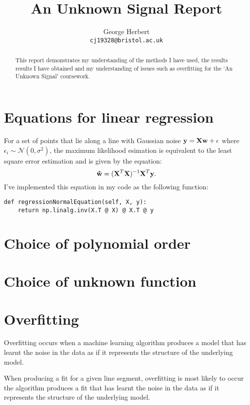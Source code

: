 \documentclass[onecolumn, 12pt, a4paper]{article}
\author{
  George Herbert\\
  \texttt{cj19328@bristol.ac.uk}
}
\title{An Unknown Signal Report}
\begin{document}
\maketitle

\begin{abstract}
    This report demonstrates my understanding of the methods I have 
    used, the results results I have obtained and my understanding
    of issues such as overfitting for the `An Unknown Signal'
    coursework.
\end{abstract}

\section{Equations for linear regression}

For a set of points that lie along a line with Gaussian noise 
$\vb{y} = \vb{X}\vb{w} + \vb{\epsilon}$ where $\epsilon_{i} \sim \mathcal{N}(0, \sigma^{2})$,
the maximum likelihood esimation is equivalent to the least square 
error estimation and is given by the equation:
\[
    \vb{\hat{w}} = (\vb{X}^{T}\vb{X})^{-1}\vb{X}^{T}\vb{y}.
\]
I've implemented this equation in my code as the following function:
\begin{verbatim}
def regressionNormalEquation(self, X, y):
    return np.linalg.inv(X.T @ X) @ X.T @ y
\end{verbatim}

\section{Choice of polynomial order}

\section{Choice of unknown function}

\section{Overfitting}

Overfitting occurs when a machine learning algorithm
produces a model that has learnt the noise in the data
as if it represents the structure of the underlying
model. \cite{MSMI}


When producing a fit for a given line segment,
overfitting is most likely to occur the algorithm 
produces a fit that has
learnt the noise in the data as if it represents the
structure of the underlying model.
\end{document}

